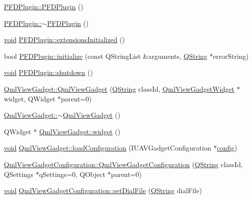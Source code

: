 \begin{DoxyCompactItemize}
\item 
\hyperlink{group___o_p_map_plugin_gaae905eda9a2b7787c1c4bde899b1d9ad}{P\-F\-D\-Plugin\-::\-P\-F\-D\-Plugin} ()
\item 
\hyperlink{group___o_p_map_plugin_ga87aa31c062c14f56bd9ef0cc4f656d89}{P\-F\-D\-Plugin\-::$\sim$\-P\-F\-D\-Plugin} ()
\item 
\hyperlink{group___u_a_v_objects_plugin_ga444cf2ff3f0ecbe028adce838d373f5c}{void} \hyperlink{group___o_p_map_plugin_ga4db36e2e23e4ade00fcf37bf863c4232}{P\-F\-D\-Plugin\-::extensions\-Initialized} ()
\item 
bool \hyperlink{group___o_p_map_plugin_ga9494fd7b5f521ffd086c63287ad01a18}{P\-F\-D\-Plugin\-::initialize} (const Q\-String\-List \&arguments, \hyperlink{group___u_a_v_objects_plugin_gab9d252f49c333c94a72f97ce3105a32d}{Q\-String} $\ast$error\-String)
\item 
\hyperlink{group___u_a_v_objects_plugin_ga444cf2ff3f0ecbe028adce838d373f5c}{void} \hyperlink{group___o_p_map_plugin_ga378193e80b5473898ab8a75bbfe0d4bb}{P\-F\-D\-Plugin\-::shutdown} ()
\item 
\hyperlink{group___o_p_map_plugin_ga20a7caf16d8ece4d83abc6c96c5a6556}{Qml\-View\-Gadget\-::\-Qml\-View\-Gadget} (\hyperlink{group___u_a_v_objects_plugin_gab9d252f49c333c94a72f97ce3105a32d}{Q\-String} class\-Id, \hyperlink{class_qml_view_gadget_widget}{Qml\-View\-Gadget\-Widget} $\ast$widget, Q\-Widget $\ast$parent=0)
\item 
\hyperlink{group___o_p_map_plugin_gacae7d443d2a8754279dd055180fc2622}{Qml\-View\-Gadget\-::$\sim$\-Qml\-View\-Gadget} ()
\item 
Q\-Widget $\ast$ \hyperlink{group___o_p_map_plugin_ga7687b494af7a9e5b6f9550ff75f4a98c}{Qml\-View\-Gadget\-::widget} ()
\item 
\hyperlink{group___u_a_v_objects_plugin_ga444cf2ff3f0ecbe028adce838d373f5c}{void} \hyperlink{group___o_p_map_plugin_ga38c57a339a1bd7d6c6295d9f4fdcd016}{Qml\-View\-Gadget\-::load\-Configuration} (I\-U\-A\-V\-Gadget\-Configuration $\ast$\hyperlink{deflate_8c_a4473b5227787415097004fd39f55185e}{config})
\item 
\hyperlink{group___o_p_map_plugin_gac44e73d868f1af30be54bb966ffc1998}{Qml\-View\-Gadget\-Configuration\-::\-Qml\-View\-Gadget\-Configuration} (\hyperlink{group___u_a_v_objects_plugin_gab9d252f49c333c94a72f97ce3105a32d}{Q\-String} class\-Id, Q\-Settings $\ast$q\-Settings=0, Q\-Object $\ast$parent=0)
\item 
\hyperlink{group___u_a_v_objects_plugin_ga444cf2ff3f0ecbe028adce838d373f5c}{void} \hyperlink{group___o_p_map_plugin_ga3811e60e4028c59e57997daf43edc66a}{Qml\-View\-Gadget\-Configuration\-::set\-Dial\-File} (\hyperlink{group___u_a_v_objects_plugin_gab9d252f49c333c94a72f97ce3105a32d}{Q\-String} dial\-File)

\end{DoxyCompactItemize}
